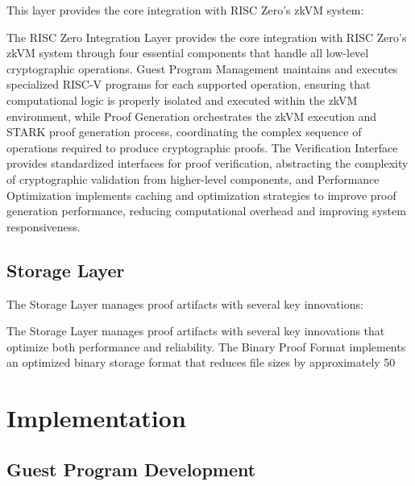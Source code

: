 \documentclass[11pt]{article}
\begin{document}
This layer provides the core integration with RISC Zero's zkVM system:

The RISC Zero Integration Layer provides the core integration with RISC Zero's zkVM system through four essential components that handle all low-level cryptographic operations. Guest Program Management maintains and executes specialized RISC-V programs for each supported operation, ensuring that computational logic is properly isolated and executed within the zkVM environment, while Proof Generation orchestrates the zkVM execution and STARK proof generation process, coordinating the complex sequence of operations required to produce cryptographic proofs. The Verification Interface provides standardized interfaces for proof verification, abstracting the complexity of cryptographic validation from higher-level components, and Performance Optimization implements caching and optimization strategies to improve proof generation performance, reducing computational overhead and improving system responsiveness.

\subsection{Storage Layer}

The Storage Layer manages proof artifacts with several key innovations:

The Storage Layer manages proof artifacts with several key innovations that optimize both performance and reliability. The Binary Proof Format implements an optimized binary storage format that reduces file sizes by approximately 50%

\section{Implementation}
\label{sec:implementation}

\subsection{Guest Program Development}
\end{document}
